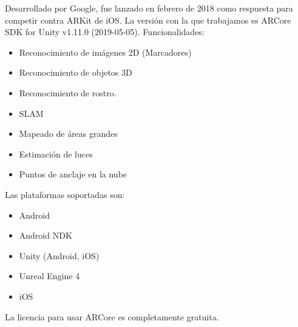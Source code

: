 Desarrollado por Google, fue lanzado en febrero de 2018 como respuesta para competir contra ARKit de iOS. La versión con la que trabajamos es ARCore SDK for Unity v1.11.0 (2019-05-05).\cite{ARCore}
Funcionalidades:
\begin{itemize}
\item Reconocimiento de imágenes 2D (Marcadores)
\item Reconocimiento de objetos 3D
\item Reconocimiento de rostro.
\end{itemize}
\begin{itemize}
\item SLAM
\item Mapeado de áreas grandes
\item Estimación de luces
\item Puntos de anclaje en la nube
\end{itemize}
Las plataformas soportadas son:
\begin{itemize}
\item Android
\item Android NDK
\item Unity (Android, iOS)
\item Unreal Engine 4
\item iOS
\end{itemize}
La licencia para usar ARCore es completamente gratuita.

\clearpage

